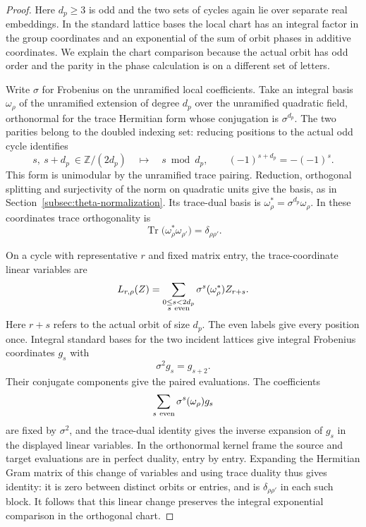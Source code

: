 \begin{proof}

Here \(d_p\ge3\) is odd and the two sets of cycles again lie
over separate real embeddings. In the standard lattice
bases the local chart has an integral factor in the group
coordinates and an exponential of the sum of orbit phases
in additive coordinates. We explain the chart comparison
because the actual orbit has odd order and the parity in the
phase calculation is on a different set of letters.

Write \(\sigma\) for Frobenius on the unramified local
coefficients. Take an integral basis \(\omega_\rho\) of the
unramified extension of degree \(d_p\) over the unramified
quadratic field, orthonormal for the trace Hermitian form
whose conjugation is \(\sigma^{d_p}\).
The two parities belong to the doubled indexing set: reducing positions to the actual odd cycle identifies
\[
  s,\ s+d_p\ \in\mathbb Z/(2d_p)\quad\longmapsto\quad s\bmod d_p,\qquad (-1)^{s+d_p}=-(-1)^s.
\]
 This form is
unimodular by the unramified trace pairing. Reduction,
orthogonal splitting and surjectivity of the norm on
quadratic units give the basis, as in
Section~\ref{subsec:theta-normalization}. Its trace-dual basis
is \(\omega_\rho^*=\sigma^{d_p}\omega_\rho\).
In these coordinates trace orthogonality is
\[
  \operatorname{Tr}\big(\omega_\rho^*\omega_{\rho'}\big)=\delta_{\rho\rho'}.
\]

On a cycle with representative \(r\) and fixed matrix entry,
the trace-coordinate linear variables are
\[
 L_{r,\rho}(Z)=\sum_{\substack{0\le s<2d_p\\s\ {\rm even}}}
              \sigma^s(\omega_\rho^*) Z_{r+s}.
\]
Here \(r+s\) refers to the actual orbit of size \(d_p\).
The even labels give every position once. Integral standard
bases for the two incident lattices give integral Frobenius
coordinates \(g_s\) with 
\[
  \sigma^2 g_s=g_{s+2}.
\]
 Their
conjugate components give the paired evaluations. The
coefficients 
\[
  \sum_{s\ {\rm even}}\sigma^s(\omega_\rho)g_s
\]
are fixed by \(\sigma^2\), and the trace-dual identity gives
the inverse expansion of \(g_s\) in the displayed linear
variables. In the orthonormal kernel frame the source and
target evaluations are in perfect duality, entry by entry.
Expanding the Hermitian Gram matrix of this change of
variables and using trace duality thus gives identity:
it is zero between distinct orbits or entries, and is
\(\delta_{\rho\rho'}\) in each such block. It follows that
this linear change preserves the integral exponential
comparison in the orthogonal chart.


\end{proof}
